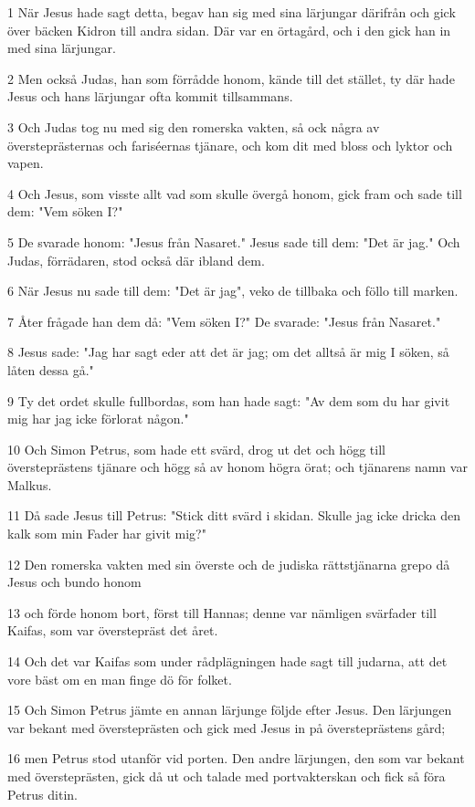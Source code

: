 \par 1 När Jesus hade sagt detta, begav han sig med sina lärjungar därifrån och gick över bäcken Kidron till andra sidan. Där var en örtagård, och i den gick han in med sina lärjungar.
\par 2 Men också Judas, han som förrådde honom, kände till det stället, ty där hade Jesus och hans lärjungar ofta kommit tillsammans.
\par 3 Och Judas tog nu med sig den romerska vakten, så ock några av översteprästernas och fariséernas tjänare, och kom dit med bloss och lyktor och vapen.
\par 4 Och Jesus, som visste allt vad som skulle övergå honom, gick fram och sade till dem: "Vem söken I?"
\par 5 De svarade honom: "Jesus från Nasaret." Jesus sade till dem: "Det är jag." Och Judas, förrädaren, stod också där ibland dem.
\par 6 När Jesus nu sade till dem: "Det är jag", veko de tillbaka och föllo till marken.
\par 7 Åter frågade han dem då: "Vem söken I?" De svarade: "Jesus från Nasaret."
\par 8 Jesus sade: "Jag har sagt eder att det är jag; om det alltså är mig I söken, så låten dessa gå."
\par 9 Ty det ordet skulle fullbordas, som han hade sagt: "Av dem som du har givit mig har jag icke förlorat någon."
\par 10 Och Simon Petrus, som hade ett svärd, drog ut det och högg till översteprästens tjänare och högg så av honom högra örat; och tjänarens namn var Malkus.
\par 11 Då sade Jesus till Petrus: "Stick ditt svärd i skidan. Skulle jag icke dricka den kalk som min Fader har givit mig?"
\par 12 Den romerska vakten med sin överste och de judiska rättstjänarna grepo då Jesus och bundo honom
\par 13 och förde honom bort, först till Hannas; denne var nämligen svärfader till Kaifas, som var överstepräst det året.
\par 14 Och det var Kaifas som under rådplägningen hade sagt till judarna, att det vore bäst om en man finge dö för folket.
\par 15 Och Simon Petrus jämte en annan lärjunge följde efter Jesus. Den lärjungen var bekant med översteprästen och gick med Jesus in på översteprästens gård;
\par 16 men Petrus stod utanför vid porten. Den andre lärjungen, den som var bekant med översteprästen, gick då ut och talade med portvakterskan och fick så föra Petrus ditin.
